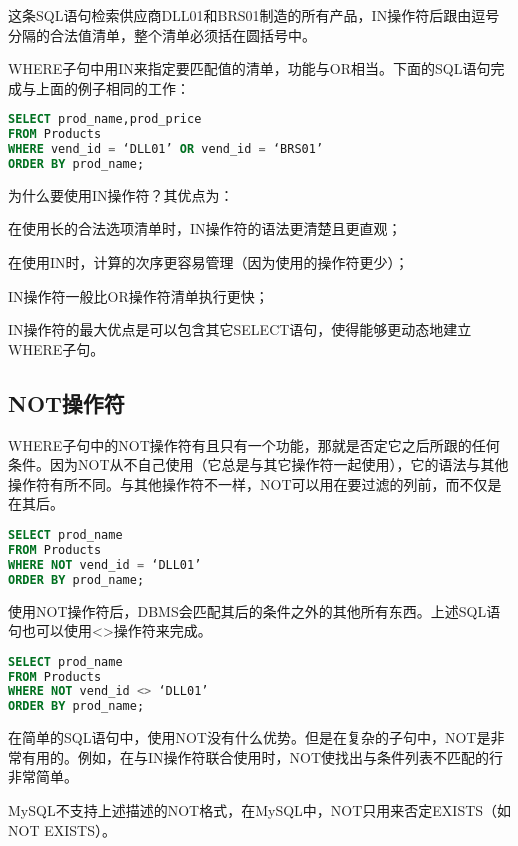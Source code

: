 这条SQL语句检索供应商DLL01和BRS01制造的所有产品，IN操作符后跟由逗号分隔的合法值清单，整个清单必须括在圆括号中。

WHERE子句中用IN来指定要匹配值的清单，功能与OR相当。下面的SQL语句完成与上面的例子相同的工作：


\begin{lstlisting}[language=SQL]
SELECT prod_name,prod_price
FROM Products
WHERE vend_id = ‘DLL01’ OR vend_id = ‘BRS01’
ORDER BY prod_name;
\end{lstlisting}

为什么要使用IN操作符？其优点为：

\begin{compactitem}
\item 在使用长的合法选项清单时，IN操作符的语法更清楚且更直观；
\item 在使用IN时，计算的次序更容易管理（因为使用的操作符更少）；
\item IN操作符一般比OR操作符清单执行更快；
\item IN操作符的最大优点是可以包含其它SELECT语句，使得能够更动态地建立WHERE子句。
\end{compactitem}


\subsection{NOT操作符}

WHERE子句中的NOT操作符有且只有一个功能，那就是否定它之后所跟的任何条件。因为NOT从不自己使用（它总是与其它操作符一起使用），它的语法与其他操作符有所不同。与其他操作符不一样，NOT可以用在要过滤的列前，而不仅是在其后。

\begin{lstlisting}[language=SQL]
SELECT prod_name
FROM Products
WHERE NOT vend_id = ‘DLL01’
ORDER BY prod_name;
\end{lstlisting}

使用NOT操作符后，DBMS会匹配其后的条件之外的其他所有东西。上述SQL语句也可以使用<>操作符来完成。

\begin{lstlisting}[language=SQL]
SELECT prod_name
FROM Products
WHERE NOT vend_id <> ‘DLL01’
ORDER BY prod_name;
\end{lstlisting}

在简单的SQL语句中，使用NOT没有什么优势。但是在复杂的子句中，NOT是非常有用的。例如，在与IN操作符联合使用时，NOT使找出与条件列表不匹配的行非常简单。

MySQL不支持上述描述的NOT格式，在MySQL中，NOT只用来否定EXISTS（如NOT EXISTS）。

